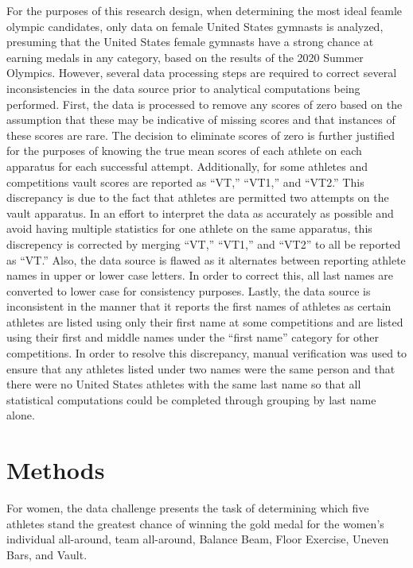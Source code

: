 \documentclass[12pt]{article}
\begin{document}
For the purposes of this research design, when determining the most ideal feamle olympic candidates, 
only data on female United States gymnasts is analyzed, presuming that the United States 
female gymnasts have a strong chance at earning medals in any category, based on the results of the 2020 Summer Olympics. 
However, several data processing steps are required to correct several inconsistencies in the data source prior to 
analytical computations being performed.
First, the data is processed to remove any scores of zero based on the assumption that these may 
be indicative of missing scores and that instances of these scores are rare. The decision to eliminate scores of 
zero is further justified for the purposes of knowing the true mean scores of each athlete on each 
apparatus for each successful attempt. Additionally, for some athletes and competitions vault
scores are reported as ``VT,'' ``VT1,'' and ``VT2.'' This discrepancy is due to the fact that athletes are permitted
two attempts on the vault apparatus. In an effort to interpret the data as accurately as possible and avoid having 
multiple statistics for one athlete on the same apparatus, this discrepency is corrected by merging ``VT,'' ``VT1,'' and 
``VT2'' to all be reported as ``VT.'' Also, the data source is flawed as it alternates between reporting athlete names
in upper or lower case letters. In order to correct this, all last names are converted to lower case for consistency 
purposes. Lastly, the data source is inconsistent in the manner that it reports the first names of athletes as certain
athletes are listed using only their first name at some competitions and are listed using their first and middle names 
under the ``first name'' category for other competitions. In order to resolve this discrepancy, manual verification was used
to ensure that any athletes listed under two names were the same person and that there were no United States  
athletes with the same last name so that all statistical computations could be completed through grouping by last 
name alone.


\section{Methods}
\label{sec:meth}

For women, the data challenge presents the task of determining 
which five athletes stand the greatest chance of winning the gold medal for the women's individual all-around,
team all-around, Balance Beam, Floor Exercise, Uneven Bars, and Vault. 
\end{document}
